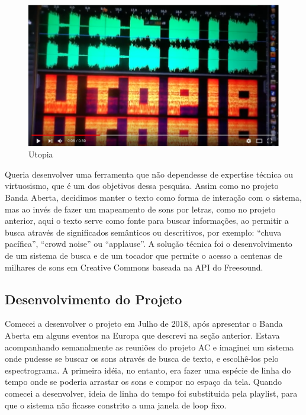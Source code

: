 \begin{figure}
\includegraphics[width=1\textwidth]{pictures/cap4/utopia}
\caption{\label{utopia}Utopia }
\label{utopia}
\end{figure}

Queria desenvolver uma ferramenta que não dependesse de expertise técnica ou virtuosismo, que é um dos objetivos dessa pesquisa. Assim como no projeto Banda Aberta, decidimos manter o texto como forma de interação com o sistema, mas ao invés de fazer um mapeamento de sons por letras, como no projeto anterior, aqui o texto serve como fonte para buscar informações, ao permitir a busca através de significados semânticos ou descritivos, por exemplo: ``chuva pacífica'', ``crowd noise'' ou ``applause''. A solução técnica foi o desenvolvimento de um sistema de busca e de um tocador que permite o acesso a centenas de milhares de sons em Creative Commons baseada na API do Freesound.


\subsection{Desenvolvimento do Projeto}

Comecei a desenvolver o projeto em Julho de 2018, após apresentar o Banda Aberta em alguns eventos na Europa que descrevi na seção anterior. Estava acompanhando semanalmente as reuniões do projeto AC e imaginei um sistema onde pudesse se buscar os sons através de busca de texto, e escolhê-los pelo espectrograma. A primeira idéia, no entanto, era fazer uma espécie de linha do tempo onde se poderia arrastar os sons e compor no espaço da tela. Quando comecei a desenvolver, ideia de linha do tempo foi substituida pela playlist, para que o sistema não ficasse constrito a uma janela de loop fixo. 

